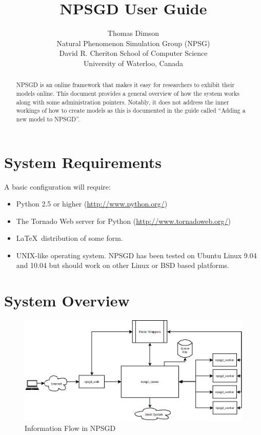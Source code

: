 \documentclass{article}
\title{NPSGD User Guide}
\author{Thomas Dimson\\Natural Phenomenon Simulation Group (NPSG)\\David R. Cheriton School of Computer Science\\University of Waterloo, Canada}
\begin{document}
\maketitle
\begin{abstract}
    NPSGD is an online framework that makes it easy for researchers to exhibit
    their models online. This document provides a general overview of how the
    system works along with some administration pointers. Notably, it does
    not address the inner workings of how to create models as this is
    documented in the guide called ``Adding a new model to NPSGD''.
\end{abstract}
\tableofcontents

\section{System Requirements}
\label{sec:requirements}
A basic configuration will require:
\begin{itemize}
    \item Python 2.5 or higher (\url{http://www.python.org/})
    \item The Tornado Web server for Python (\url{http://www.tornadoweb.org/})
    \item \LaTeX\ distribution of some form.
    \item UNIX-like operating system. NPSGD has been tested on Ubuntu Linux 9.04
    and 10.04 but should work on other Linux or BSD based platforms.
\end{itemize}


\section{System Overview}

\begin{figure}[ht]
    \centering
    \includegraphics[width=6in]{npsgd_layout.png}
    \caption{Information Flow in NPSGD}
\end{figure}
\end{document}
